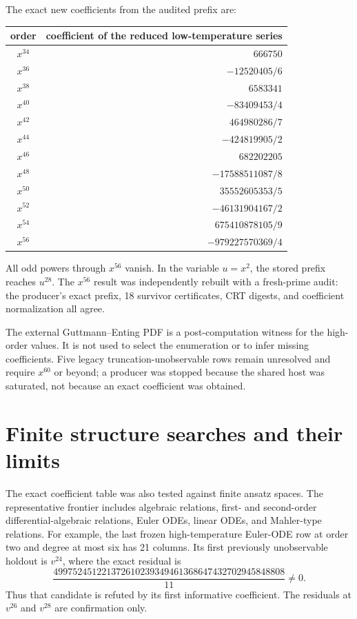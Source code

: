 \documentclass[11pt]{article}
\begin{document}
The exact new coefficients from the audited prefix are:
\begin{center}
\begin{tabular}{c|r}
order & coefficient of the reduced low-temperature series\\ \midrule
$x^{34}$ & $666750$\\
$x^{36}$ & $-12520405/6$\\
$x^{38}$ & $6583341$\\
$x^{40}$ & $-83409453/4$\\
$x^{42}$ & $464980286/7$\\
$x^{44}$ & $-424819905/2$\\
$x^{46}$ & $682202205$\\
$x^{48}$ & $-17588511087/8$\\
$x^{50}$ & $35552605353/5$\\
$x^{52}$ & $-46131904167/2$\\
$x^{54}$ & $675410878105/9$\\
$x^{56}$ & $-979227570369/4$
\end{tabular}
\end{center}
All odd powers through $x^{56}$ vanish.  In the variable $u=x^2$, the stored prefix reaches $u^{28}$.  The $x^{56}$ result was independently rebuilt with a fresh-prime audit: the producer's exact prefix, 18 survivor certificates, CRT digests, and coefficient normalization all agree.

The external Guttmann--Enting PDF is a post-computation witness for the high-order values.  It is not used to select the enumeration or to infer missing coefficients.  Five legacy truncation-unobservable rows remain unresolved and require $x^{60}$ or beyond; a producer was stopped because the shared host was saturated, not because an exact coefficient was obtained.

\section{Finite structure searches and their limits}
The exact coefficient table was also tested against finite ansatz spaces.  The representative frontier includes algebraic relations, first- and second-order differential-algebraic relations, Euler ODEs, linear ODEs, and Mahler-type relations.  For example, the last frozen high-temperature Euler-ODE row at order two and degree at most six has 21 columns.  Its first previously unobservable holdout is $v^{24}$, where the exact residual is
\[
 \frac{499752451221372610239349461368647432702945848808}{11}\neq0.
\]
Thus that candidate is refuted by its first informative coefficient.  The residuals at $v^{26}$ and $v^{28}$ are confirmation only.
\end{document}
